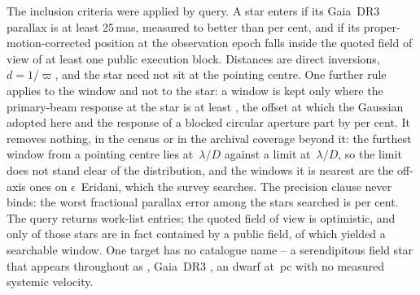The inclusion criteria were applied by query. A star enters
if its Gaia~DR3 parallax is at least 25\,mas, measured to better than
\PlxAdqlPct{} per cent, and if its proper-motion-corrected position at the
observation epoch falls inside the quoted field of view of at least one
public execution block. Distances are direct inversions, $d=1/\varpi$, and
the star need not sit at the pointing centre. One further rule applies to the
window and not to the star: a window is kept only where the primary-beam
response at the star is at least \BmFloorResp, the offset at which the
Gaussian adopted here and the response of a blocked circular aperture
part by \BmFloorTolPct{} per cent. It removes nothing, in the census or in
the archival coverage beyond it: the furthest window from a pointing centre
lies at \ExCWorstExt\,$\lambda/D$ against a limit at
\BmFloorC\,$\lambda/D$, so the limit does not stand clear of the
distribution, and the windows it is nearest are the off-axis ones on
$\epsilon$~Eridani, which the survey searches.
The precision clause never binds: the worst fractional parallax
error among the stars searched is \SfPlxWorstPct{} per cent. The query returns
\NCensus{} work-list entries; the quoted field of view is optimistic, and
only \NGenuinelyCovered{} of those stars are in fact contained by a public
field, of which \NStars{} yielded a searchable window. One target has no
catalogue name -- a serendipitous field star that appears throughout as
\BkAlmaName, Gaia~DR3 \BkAlmaGaia, an \BkAlmaSpType{} dwarf at
\BkAlmaDistPc\,pc with no measured systemic velocity.

